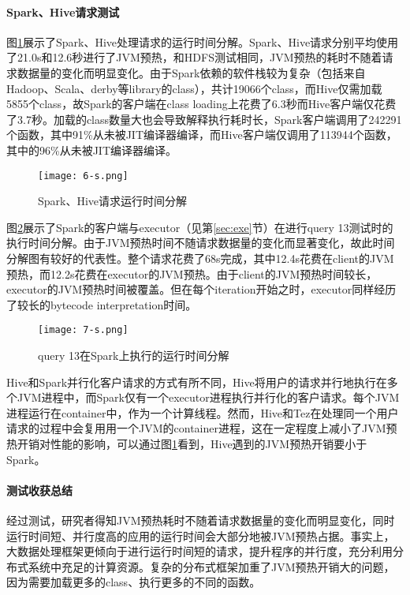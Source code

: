 \documentclass[lang=cn,12pt,a4paper,cite=authoryear]{elegantpaper}
\begin{document}
\paragraph{Spark、Hive请求测试}
图\ref{fig:br2}展示了Spark、Hive处理请求的运行时间分解。Spark、Hive请求分别平均使用了21.0s和12.6秒进行了JVM预热，和HDFS测试相同，JVM预热的耗时不随着请求数据量的变化而明显变化。由于Spark依赖的软件栈较为复杂（包括来自Hadoop、Scala、derby等library的class），共计19066个class，而Hive仅需加载5855个class，故Spark的客户端在class loading上花费了6.3秒而Hive客户端仅花费了3.7秒。加载的class数量大也会导致解释执行耗时长，Spark客户端调用了242291个函数，其中91\%从未被JIT编译器编译，而Hive客户端仅调用了113944个函数，其中的96\%从未被JIT编译器编译。

\begin{figure}[!htp]
  \centering
  \texttt{[image: 6-s.png]}
  \caption{Spark、Hive请求运行时间分解}
  \label{fig:br2}
\end{figure}

图\ref{fig:br3}展示了Spark的客户端与executor（见第\ref{sec:exe}节）在进行query 13测试时的执行时间分解。由于JVM预热时间不随请求数据量的变化而显著变化，故此时间分解图有较好的代表性。整个请求花费了68s完成，其中12.4s花费在client的JVM预热，而12.2s花费在executor的JVM预热。由于client的JVM预热时间较长，executor的JVM预热时间被覆盖。但在每个iteration开始之时，executor同样经历了较长的bytecode interpretation时间。

\begin{figure}[!htp]
  \centering
  \texttt{[image: 7-s.png]}
  \caption{query 13在Spark上执行的运行时间分解}
  \label{fig:br3}
\end{figure}

Hive和Spark并行化客户请求的方式有所不同，Hive将用户的请求并行地执行在多个JVM进程中，而Spark仅有一个executor进程执行并行化的客户请求。每个JVM进程运行在container中，作为一个计算线程。然而，Hive和Tez在处理同一个用户请求的过程中会复用用一个JVM的container进程，这在一定程度上减小了JVM预热开销对性能的影响，可以通过图\ref{fig:br2}看到，Hive遇到的JVM预热开销要小于Spark。

\paragraph{测试收获总结}
经过测试，研究者得知JVM预热耗时不随着请求数据量的变化而明显变化，同时运行时间短、并行度高的应用的运行时间会大部分地被JVM预热占据。事实上，大数据处理框架更倾向于进行运行时间短的请求，提升程序的并行度，充分利用分布式系统中充足的计算资源。复杂的分布式框架加重了JVM预热开销大的问题，因为需要加载更多的class、执行更多的不同的函数。
\end{document}
